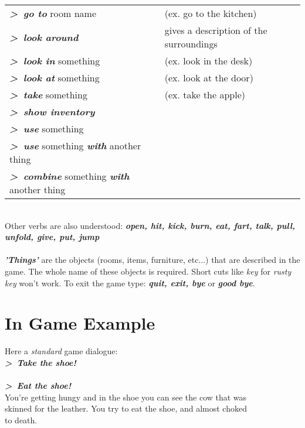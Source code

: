 \documentclass{article}
\begin{document}
	\begin{tabular}{ l l }
	   \textbf{ \textit{ \textgreater \ go to}} room name & (ex. go to the kitchen) \\
	   \textbf{ \textit{ \textgreater \ look around          }}         &    gives a description of the surroundings             \\
 	   \textbf{ \textit{ \textgreater \ look in }}something &  (ex. look in the desk) \\
  	   \textbf{ \textit{ \textgreater \ look at}} something & (ex. look at the door) \\
 	   \textbf{ \textit{ \textgreater \ take }} something      & (ex. take the apple) \\
 	   \textbf{ \textit{ \textgreater \ show inventory }}            &                  \\
 	   \textbf{ \textit{ \textgreater \ use }}something       &               \\
 	   \textbf{ \textit{ \textgreater \ use }}something  \textbf{ \textit{with}} another thing &    \\
 	   \textbf{ \textit{ \textgreater \ combine }} something \textbf{ \textit{ with}} another thing &  \\
	\end{tabular}\\
	
	Other verbs are also understood: \textbf{ \textit{open, hit, kick, burn, eat, fart, talk, pull, unfold, give, put, jump}} \\ \\
	\textbf{ \textit{'Things'}} are the objects (rooms, items, furniture, etc...) that are described in the game. The whole 
	name of these objects is required. Short cuts like \textit{key} for \textit{rusty key} won't work.
	To exit the game type: \textbf{ \textit{quit, exit, bye}} or \textbf{ \textit{good bye}}.
	
         

\section{In Game Example}
	Here a \textit{standard} game dialogue: \\
	
	\textbf{ \textit{ \textgreater \ Take the shoe!} } \\
	  \hspace*{15 pt}{You have the shoe.} \\
	\hspace*{0 pt}\textbf{ \textit{ \textgreater \ Eat the shoe!} } \\
	{  \hspace*{12 pt}   You're getting hungy and in the shoe you can see the cow that was} \\
 	{  \hspace*{12 pt}   skinned for the leather. You try to eat the shoe, and almost choked} \\
 	{  \hspace*{12 pt}   to death.}  \\
\end{document}

